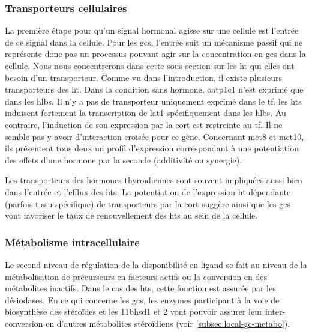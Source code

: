 \documentclass[../main.tex]{subfiles}
\begin{document}
		\subsubsection{Transporteurs cellulaires}
			La première étape pour qu'un signal hormonal agisse sur une cellule est l'entrée de ce signal dans la cellule.
			Pour les \glspl{gc}, l'entrée suit un mécanisme passif qui ne représente donc pas un processus pouvant agir sur la concentration en \glspl{gc} dans la cellule.
			Nous nous concentrerons dans cette sous-section sur les \gls{ht} qui elles ont besoin d'un transporteur.
			Comme vu dans l'introduction, il existe plusieurs transporteurs des \gls{ht}.
			Dans la condition sans hormone, \gls{oatp}1c1 n'est exprimé que dans les \glspl{hlb}.
			Il n'y a pas de transporteur uniquement exprimé dans le \gls{tf}.
			les \glspl{ht} induisent fortement la transcription de \gls{lat}1 spécifiquement dans les \glspl{hlb}.
			Au contraire, l'induction de son expression par la \gls{cort} est restreinte au \gls{tf}.
			Il ne semble pas y avoir d'interaction croisée pour ce gène.
			Concernant \gls{mct}8 et \gls{mct}10, ils présentent tous deux un profil d'expression correspondant à une potentiation des effets d'une hormone par la seconde (additivité ou synergie).
			\par
			Les transporteurs des hormones thyroïdiennes sont souvent impliquées aussi bien dans l'entrée et l'efflux des \glspl{ht}.
			La potentiation de l'expression \gls{ht}-dépendante (parfois tissu-spécifique) de transporteurs par la \gls{cort} suggère ainsi que les \glspl{gc} vont favoriser le taux de renouvellement des \glspl{ht} au sein de la cellule.

		\subsubsection{Métabolisme intracellulaire}
			Le second niveau de régulation de la disponibilité en ligand se fait au niveau de la métabolisation de précurseurs en facteurs actifs ou la conversion en des métabolites inactifs.
			Dans le cas des \glspl{ht}, cette fonction est assurée par les désiodases.
			En ce qui concerne les \glspl{gc}, les enzymes participant à la voie de biosynthèse des stéroïdes et les \gls{11bhsd1} et 2 vont pouvoir assurer leur inter-conversion en d'autres métabolites stéroïdiens (voir \autoref{subsec:local-gc-metabo}).
\end{document}
